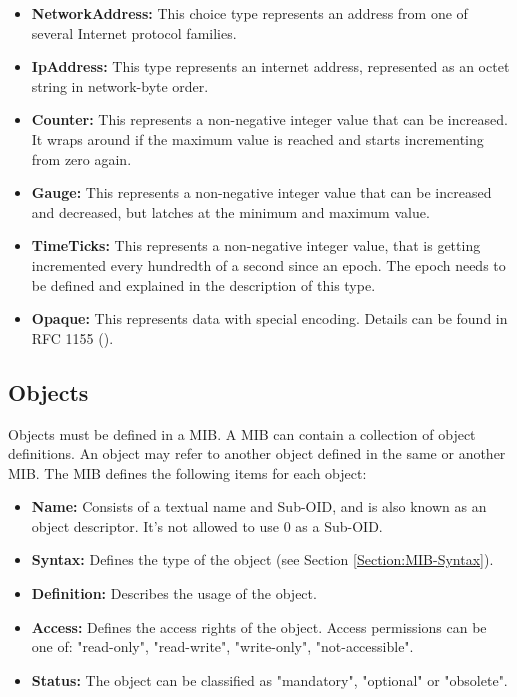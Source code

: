 \begin{minipage}{\textwidth}
\begin{itemize}
    \item \textbf{NetworkAddress:} This choice type represents an address from one of several Internet protocol families.
    \item \textbf{IpAddress:} This type represents an internet address, represented as an octet string in network-byte order.
    \item \textbf{Counter:} This represents a non-negative integer value that can be increased. It wraps around if the maximum value is reached and starts incrementing from zero again.
    \item \textbf{Gauge:} This represents a non-negative integer value that can be increased and decreased, but latches at the minimum and maximum value.
    \item \textbf{TimeTicks:} This represents a non-negative integer value, that is getting incremented every hundredth of a second since an epoch. The epoch needs to be defined and explained in the description of this type.
    \item \textbf{Opaque:} This represents data with special encoding. Details can be found in RFC 1155 (\cite{RFC:RFC1155:1990}).
\end{itemize}
\end{minipage}


\subsection{Objects}
\label{Section:MIB-Managed_Objects}

Objects must be defined in a MIB. A MIB can contain a collection of object definitions. An object may refer to another object defined in the same or another MIB. The MIB defines the following items for each object:

\begin{minipage}{\textwidth}
\begin{itemize}
    \item \textbf{Name:} Consists of a textual name and Sub-OID, and is also known as an object descriptor. It's not allowed to use 0 as a Sub-OID.
    \item \textbf{Syntax:} Defines the type of the object (see Section \ref{Section:MIB-Syntax}).
    \item \textbf{Definition:} Describes the usage of the object.
    \item \textbf{Access:} Defines the access rights of the object. Access permissions can be one of: "read-only", "read-write", "write-only", "not-accessible".
    \item \textbf{Status:} The object can be classified as "mandatory", "optional" or "obsolete".
\end{itemize}
\end{minipage}


